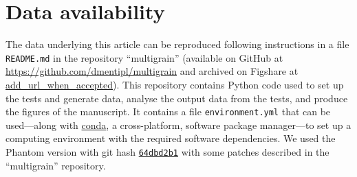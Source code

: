 \documentclass[fleqn,usenatbib]{mnras}
\begin{document}
\section*{Data availability}

The data underlying this article can be reproduced following instructions in a
file \texttt{README.md} in the repository ``multigrain'' (available on GitHub at
\url{https://github.com/dmentipl/multigrain} and archived on Figshare at
\url{add_url_when_accepted}). This repository contains Python code used to set
up the tests and generate data, analyse the output data from the tests, and
produce the figures of the manuscript. It contains a file
\texttt{environment.yml} that can be used---along with
\href{https://conda.io/}{conda}, a cross-platform, software package manager---to
set up a computing environment with the required software dependencies. We used
the Phantom version with git hash
\href{https://github.com/danieljprice/phantom/commit/64dbd2b124ca74051eed920d6cad0a2e83157478}{\texttt{64dbd2b1}}
with some patches described in the ``multigrain'' repository.














\bsp %
\label{lastpage}
\end{document}
